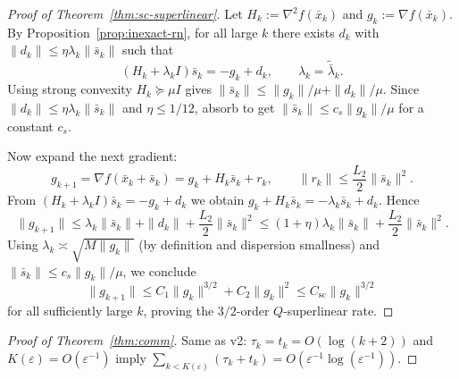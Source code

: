 \documentclass[11pt,a4paper]{article}
\def\cO{O}%
\newcommand{\cO}{\mathcal{O}}
\begin{document}
\begin{proof}[Proof of Theorem~\ref{thm:sc-superlinear}]
	Let $H_k:=\nabla^2 f(\bar x_k)$ and $g_k:=\nabla f(\bar x_k)$.
	By Proposition~\ref{prop:inexact-rn}, for all large $k$ there exists $d_k$ with
	$\|d_k\|\le \eta \lambda_k\|\bar s_k\|$ such that
	\[
	(H_k+\lambda_k I)\bar s_k = -g_k + d_k,
	\qquad \lambda_k=\tilde{\bar\lambda}_k.
	\]
	Using strong convexity $H_k\succeq \mu I$ gives $\|\bar s_k\|\le \|g_k\|/\mu + \|d_k\|/\mu$.
	Since $\|d_k\|\le \eta \lambda_k\|\bar s_k\|$ and $\eta\le 1/12$, absorb to get $\|\bar s_k\|\le c_s \|g_k\|/\mu$ for a constant $c_s$.
	
	Now expand the next gradient:
	\[
	g_{k+1}=\nabla f(\bar x_k+\bar s_k)=g_k + H_k\bar s_k + r_k,
	\qquad \|r_k\|\le \frac{L_2}{2}\|\bar s_k\|^2.
	\]
	From $(H_k+\lambda_k I)\bar s_k = -g_k + d_k$ we obtain $g_k+H_k\bar s_k = -\lambda_k \bar s_k + d_k$.
	Hence
	\[
	\|g_{k+1}\|\le \lambda_k\|\bar s_k\| + \|d_k\| + \frac{L_2}{2}\|\bar s_k\|^2
	\le (1+\eta)\lambda_k\|\bar s_k\| + \frac{L_2}{2}\|\bar s_k\|^2.
	\]
	Using $\lambda_k\asymp \sqrt{M\|g_k\|}$ (by definition and dispersion smallness) and $\|\bar s_k\|\le c_s\|g_k\|/\mu$,
	we conclude
	\[
	\|g_{k+1}\|\le C_1 \|g_k\|^{3/2} + C_2 \|g_k\|^2
	\le C_{\mathrm{sc}}\|g_k\|^{3/2}
	\]
	for all sufficiently large $k$, proving the $3/2$-order $Q$-superlinear rate.
\end{proof}

\begin{proof}[Proof of Theorem~\ref{thm:comm}]
	Same as v2: $\tau_k=t_k=\cO(\log(k+2))$ and $K(\varepsilon)=\cO(\varepsilon^{-1})$ imply
	$\sum_{k< K(\varepsilon)}(\tau_k+t_k)=\cO(\varepsilon^{-1}\log(\varepsilon^{-1}))$.
\end{proof}
\end{document}
